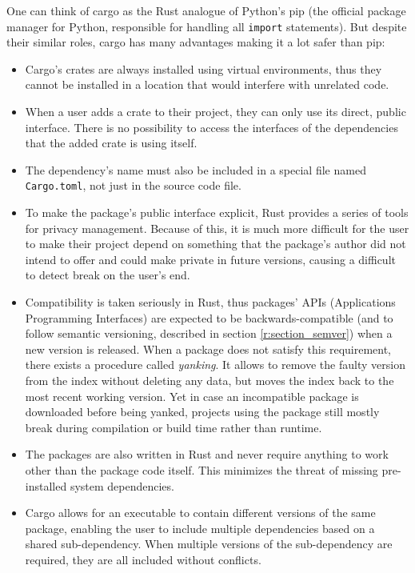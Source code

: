 \documentclass[licencjacka,en]{pracamgr}
\begin{document}
One can think of cargo as the Rust analogue of Python's pip (the official package manager for
Python, responsible for handling all \texttt{import} statements). But despite their similar roles,
cargo has many advantages making it a lot safer than pip:
\begin{itemize}
	\item Cargo's crates are always installed using virtual environments, thus they cannot be
		installed in a location that would interfere with unrelated code.
	\item When a user adds a crate to their project, they can only use its direct, public interface.
		There is no possibility to access the interfaces of the dependencies that the added crate
		is using itself.
	\item The dependency's name must also be included in a special file named \texttt{Cargo.toml},
		not just in the source code file.
	\item To make the package's public interface explicit, Rust provides a series of tools for
		privacy management. Because of this, it is much more difficult for the user to make their
		project depend on something that the package's author did not intend to offer and could
		make private in future versions, causing a difficult to detect break on the user's end.
	\item Compatibility is taken seriously in Rust, thus packages' APIs (Applications Programming
		Interfaces) are expected to be backwards-compatible (and to follow semantic versioning,
		described in section \ref{r:section_semver}) when a new version is released. When a package
		does not satisfy this requirement, there exists a procedure called \textit{yanking}.
		It allows to remove the faulty version from the index without deleting any data, but moves
		the index back to the most recent working version. Yet in case an incompatible package is
		downloaded before being yanked, projects using the package still mostly break during
		compilation or build time rather than runtime.
	\item The packages are also written in Rust and never require anything to work other than the
		package code itself. This minimizes the threat of missing pre-installed
		system dependencies.
	\item Cargo allows for an executable to contain different versions of the same package,
		enabling the user to include multiple dependencies based on a shared sub-dependency.
		When multiple versions of the sub-dependency are required, they are all included
		without conflicts.
\end{itemize}
\end{document}
